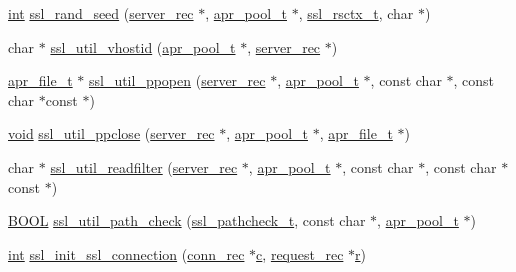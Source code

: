 \begin{DoxyCompactItemize}
\item 
\hyperlink{pcre_8txt_a42dfa4ff673c82d8efe7144098fbc198}{int} \hyperlink{group__MOD__SSL__PRIVATE_gaf0f8bd768edad2c6d116a824f0762b7f}{ssl\+\_\+rand\+\_\+seed} (\hyperlink{structserver__rec}{server\+\_\+rec} $\ast$, \hyperlink{structapr__pool__t}{apr\+\_\+pool\+\_\+t} $\ast$, \hyperlink{group__MOD__SSL__PRIVATE_ga368ff85eb593119b57fd6f64fad13947}{ssl\+\_\+rsctx\+\_\+t}, char $\ast$)
\item 
char $\ast$ \hyperlink{group__MOD__SSL__PRIVATE_ga4859682f0f286b871c73fc78611871af}{ssl\+\_\+util\+\_\+vhostid} (\hyperlink{structapr__pool__t}{apr\+\_\+pool\+\_\+t} $\ast$, \hyperlink{structserver__rec}{server\+\_\+rec} $\ast$)
\item 
\hyperlink{structapr__file__t}{apr\+\_\+file\+\_\+t} $\ast$ \hyperlink{group__MOD__SSL__PRIVATE_gaee3bbdfa1799ee28156384bc373e0156}{ssl\+\_\+util\+\_\+ppopen} (\hyperlink{structserver__rec}{server\+\_\+rec} $\ast$, \hyperlink{structapr__pool__t}{apr\+\_\+pool\+\_\+t} $\ast$, const char $\ast$, const char $\ast$const $\ast$)
\item 
\hyperlink{group__MOD__ISAPI_gacd6cdbf73df3d9eed42fa493d9b621a6}{void} \hyperlink{group__MOD__SSL__PRIVATE_gafec59822590bb26521d5413c6fbf3b4e}{ssl\+\_\+util\+\_\+ppclose} (\hyperlink{structserver__rec}{server\+\_\+rec} $\ast$, \hyperlink{structapr__pool__t}{apr\+\_\+pool\+\_\+t} $\ast$, \hyperlink{structapr__file__t}{apr\+\_\+file\+\_\+t} $\ast$)
\item 
char $\ast$ \hyperlink{group__MOD__SSL__PRIVATE_ga651f7262ac586eb3df9e357304fd7b36}{ssl\+\_\+util\+\_\+readfilter} (\hyperlink{structserver__rec}{server\+\_\+rec} $\ast$, \hyperlink{structapr__pool__t}{apr\+\_\+pool\+\_\+t} $\ast$, const char $\ast$, const char $\ast$const $\ast$)
\item 
\hyperlink{pcre__internal_8h_a050c65e107f0c828f856a231f4b4e788}{B\+O\+OL} \hyperlink{group__MOD__SSL__PRIVATE_gaa3fa9925c8737f7d2164a07492618be8}{ssl\+\_\+util\+\_\+path\+\_\+check} (\hyperlink{group__MOD__SSL__PRIVATE_ga9c80719ccb88e941c1473a4456d662ed}{ssl\+\_\+pathcheck\+\_\+t}, const char $\ast$, \hyperlink{structapr__pool__t}{apr\+\_\+pool\+\_\+t} $\ast$)
\item 
\hyperlink{pcre_8txt_a42dfa4ff673c82d8efe7144098fbc198}{int} \hyperlink{group__MOD__SSL__PRIVATE_ga41dd90c37aff54ebfb37071f8b6a3b46}{ssl\+\_\+init\+\_\+ssl\+\_\+connection} (\hyperlink{structconn__rec}{conn\+\_\+rec} $\ast$\hyperlink{pcregrep_8txt_aef720ae5f62fa015619d00171d917416}{c}, \hyperlink{structrequest__rec}{request\+\_\+rec} $\ast$\hyperlink{pcregrep_8txt_a2e9e9438b26c0bb4425367a7e4f75eb3}{r})

\end{DoxyCompactItemize}
